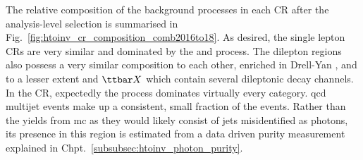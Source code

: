 The relative composition of the background processes in each \gls{CR} after the analysis-level selection is summarised in Fig.~\ref{fig:htoinv_cr_composition_comb2016to18}. As desired, the single lepton \glspl{CR} are very similar and dominated by the \ttbar and \wtolnu process. The dilepton regions also possess a very similar composition to each other, enriched in Drell-Yan \ztoll, and to a lesser extent \ttbar and $\ttbar X$ which contain several dileptonic decay channels. In the \singlePhotonCr \gls{CR}, expectedly the \gammapjets process dominates virtually every category. \acrshort{qcd} multijet events make up a consistent, small fraction of the events. Rather than the yields from \acrshort{mc} as they would likely consist of \glspl{jet} misidentified as photons, its presence in this region is estimated from a data driven purity measurement explained in Chpt.~\ref{subsubsec:htoinv_photon_purity}.

